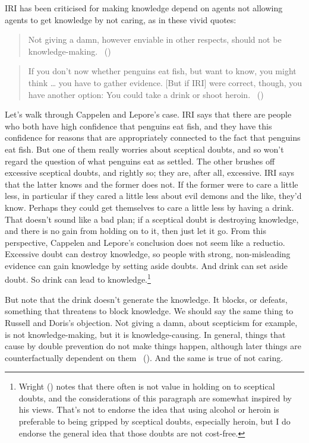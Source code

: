 \documentclass[
  11pt,
  letterpaper,
  DIV=11,
  numbers=noendperiod,
  twoside]{scrartcl}
\begin{document}
IRI has been criticised for making knowledge depend on agents not
allowing agents to get knowledge by not caring, as in these vivid
quotes:

\begin{quote}
Not giving a damn, however enviable in other respects, should not be
knowledge-making. ~()
\end{quote}

\begin{quote}
If you don't now whether penguins eat fish, but want to know, you might
think \ldots{} you have to gather evidence. {[}But if IRI{]} were
correct, though, you have another option: You could take a drink or
shoot heroin. ~()
\end{quote}

Let's walk through Cappelen and Lepore's case. IRI says that there are
people who both have high confidence that penguins eat fish, and they
have this confidence for reasons that are appropriately connected to the
fact that penguins eat fish. But one of them really worries about
sceptical doubts, and so won't regard the question of what penguins eat
as settled. The other brushes off excessive sceptical doubts, and
rightly so; they are, after all, excessive. IRI says that the latter
knows and the former does not. If the former were to care a little less,
in particular if they cared a little less about evil demons and the
like, they'd know. Perhaps they could get themselves to care a little
less by having a drink. That doesn't sound like a bad plan; if a
sceptical doubt is destroying knowledge, and there is no gain from
holding on to it, then just let it go. From this perspective, Cappelen
and Lepore's conclusion does not seem like a reductio. Excessive doubt
can destroy knowledge, so people with strong, non-misleading evidence
can gain knowledge by setting aside doubts. And drink can set aside
doubt. So drink can lead to knowledge.\footnote{Wright
  () notes that there often is not value
  in holding on to sceptical doubts, and the considerations of this
  paragraph are somewhat inspired by his views. That's not to endorse
  the idea that using alcohol or heroin is preferable to being gripped
  by sceptical doubts, especially heroin, but I do endorse the general
  idea that those doubts are not cost-free.}

But note that the drink doesn't generate the knowledge. It blocks, or
defeats, something that threatens to block knowledge. We should say the
same thing to Russell and Doris's objection. Not giving a damn, about
scepticism for example, is not knowledge-making, but it is
knowledge-causing. In general, things that cause by double prevention do
not make things happen, although later things are counterfactually
dependent on them ~(). And the same
is true of not caring.
\end{document}
